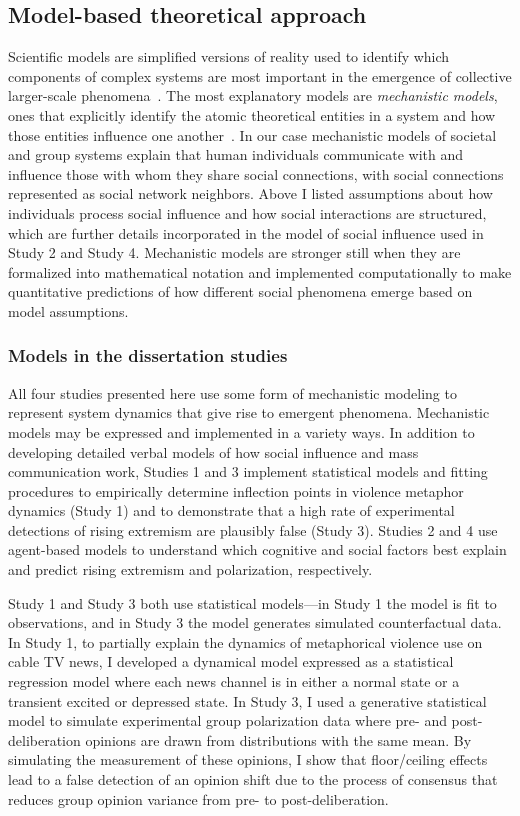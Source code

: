 \documentclass[12pt,letterpaper]{article}
\begin{document}
\subsection{Model-based theoretical approach}

Scientific models are simplified versions of reality used to identify which components of
complex systems are most important in the emergence of collective larger-scale
phenomena~\cite{Kauffman1970,Wimsatt1972,Wimsatt1997,Machamer2000,Wimsatt2007,Smaldino2017}.
The most explanatory models are \emph{mechanistic models}, ones that explicitly identify the atomic theoretical 
entities in a system and how those entities influence one another~\cite{Machamer2000,Craver2006,Turner2021}. 
In our case mechanistic models of societal and group systems explain that
human individuals communicate with and influence those with whom they share
social connections, with social connections represented as social network neighbors. 
Above I listed
assumptions about how individuals process social influence and how social
interactions are structured, which are further details incorporated in the
model of social influence used in Study 2 and Study 4. 
Mechanistic models are stronger still when they are 
formalized into mathematical notation and implemented computationally to
make quantitative predictions of how different social phenomena emerge based
on model assumptions. 


\subsubsection{Models in the dissertation studies}

All four studies presented here use some form of mechanistic modeling to 
represent system dynamics that give rise to emergent phenomena. Mechanistic
models may be expressed and implemented in a variety ways. In addition to 
developing detailed verbal models of how social influence and mass
communication work, Studies 1 and 3 implement statistical models and 
fitting procedures to empirically
determine inflection points in violence metaphor dynamics (Study 1) and 
to demonstrate that a high rate of experimental detections of rising extremism
are plausibly false (Study 3). Studies 2 and 4 use 
agent-based models to understand which cognitive and social factors best explain
and predict rising extremism and polarization, respectively.

Study 1 and Study 3 both use statistical models---in Study 1 the model is fit
to observations, and in Study 3 the model generates simulated counterfactual
data. In Study 1, to partially explain the dynamics of metaphorical violence use on cable TV news,
I developed a dynamical model expressed as a statistical regression
model where each news channel is in either a normal state or a 
transient excited or depressed state.  
In Study 3, I used a generative 
statistical model to simulate experimental group polarization data where
pre- and post-deliberation opinions are drawn from distributions with the
same mean. By simulating the measurement of these opinions, I show
that floor/ceiling effects lead to a false detection of an opinion shift due to
the process of consensus that reduces group opinion variance from
pre- to post-deliberation.
\end{document}
